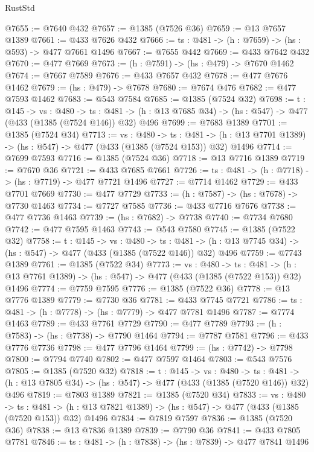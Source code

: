 \begin{lexlean}{RustStd}
\begin{coremodule}
{\begin{coremodule}
{{{{{{{{{{{{{{{{@7655 := @7640 @432
@7657 := @1385 (@7526 @36)
@7659 := @13 @7657 @1389
@7661 := @433 @7626 @432
@7666 := {ts : @481} -> (h : @7659) -> (hs : @593) -> @477 @7661 @1496
@7667 := @7655 @442
@7669 := @433 @7642 @432
@7670 := @477 @7669
@7673 := (h : @7591) -> (hs : @479) -> @7670 @1462
@7674 := @7667 @7589
@7676 := @433 @7657 @432
@7678 := @477 @7676 @1462
@7679 := (hs : @479) -> @7678
@7680 := @7674 @476
@7682 := @477 @7593 @1462
@7683 := @543 @7584
@7685 := @1385 (@7524 @32)
@7698 := {t : @145} ->
  {vs : @480} ->
  {ts : @481} -> (h : @13 @7685 @34) -> (hs : @547) -> @477 (@433 (@1385 (@7524 @146)) @32) @496
@7699 := @7683 @1389
@7701 := @1385 (@7524 @34)
@7713 := {vs : @480} ->
  {ts : @481} -> (h : @13 @7701 @1389) -> (hs : @547) -> @477 (@433 (@1385 (@7524 @153)) @32) @1496
@7714 := @7699 @7593
@7716 := @1385 (@7524 @36)
@7718 := @13 @7716 @1389
@7719 := @7670 @36
@7721 := @433 @7685 @7661
@7726 := {ts : @481} -> (h : @7718) -> (hs : @7719) -> @477 @7721 @1496
@7727 := @7714 @1462
@7729 := @433 @7701 @7669
@7730 := @477 @7729
@7733 := (h : @7587) -> (hs : @7678) -> @7730 @1463
@7734 := @7727 @7585
@7736 := @433 @7716 @7676
@7738 := @477 @7736 @1463
@7739 := (hs : @7682) -> @7738
@7740 := @7734 @7680
@7742 := @477 @7595 @1463
@7743 := @543 @7580
@7745 := @1385 (@7522 @32)
@7758 := {t : @145} ->
  {vs : @480} ->
  {ts : @481} -> (h : @13 @7745 @34) -> (hs : @547) -> @477 (@433 (@1385 (@7522 @146)) @32) @496
@7759 := @7743 @1389
@7761 := @1385 (@7522 @34)
@7773 := {vs : @480} ->
  {ts : @481} -> (h : @13 @7761 @1389) -> (hs : @547) -> @477 (@433 (@1385 (@7522 @153)) @32) @1496
@7774 := @7759 @7595
@7776 := @1385 (@7522 @36)
@7778 := @13 @7776 @1389
@7779 := @7730 @36
@7781 := @433 @7745 @7721
@7786 := {ts : @481} -> (h : @7778) -> (hs : @7779) -> @477 @7781 @1496
@7787 := @7774 @1463
@7789 := @433 @7761 @7729
@7790 := @477 @7789
@7793 := (h : @7583) -> (hs : @7738) -> @7790 @1464
@7794 := @7787 @7581
@7796 := @433 @7776 @7736
@7798 := @477 @7796 @1464
@7799 := (hs : @7742) -> @7798
@7800 := @7794 @7740
@7802 := @477 @7597 @1464
@7803 := @543 @7576
@7805 := @1385 (@7520 @32)
@7818 := {t : @145} ->
  {vs : @480} ->
  {ts : @481} -> (h : @13 @7805 @34) -> (hs : @547) -> @477 (@433 (@1385 (@7520 @146)) @32) @496
@7819 := @7803 @1389
@7821 := @1385 (@7520 @34)
@7833 := {vs : @480} ->
  {ts : @481} -> (h : @13 @7821 @1389) -> (hs : @547) -> @477 (@433 (@1385 (@7520 @153)) @32) @1496
@7834 := @7819 @7597
@7836 := @1385 (@7520 @36)
@7838 := @13 @7836 @1389
@7839 := @7790 @36
@7841 := @433 @7805 @7781
@7846 := {ts : @481} -> (h : @7838) -> (hs : @7839) -> @477 @7841 @1496
}}}}}}}}}}}}}}}}
\end{coremodule}}
\end{coremodule}
\end{lexlean}
